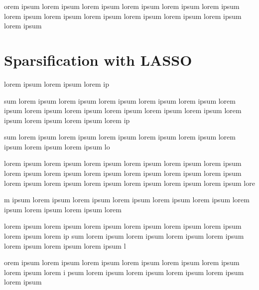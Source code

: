 \documentclass{article}
\begin{document}
\begin{multicols}{2}
orem ipsum lorem ipsum lorem ipsum lorem ipsum lorem ipsum lorem ipsum lorem ipsum lorem ipsum lorem ipsum lorem ipsum lorem ipsum lorem ipsum lorem ipsum





\section{Sparsification with LASSO}

lorem ipsum lorem ipsum lorem ip

sum lorem ipsum lorem ipsum lorem ipsum lorem ipsum lorem ipsum lorem ipsum lorem ipsum lorem ipsum lorem ipsum lorem ipsum lorem ipsum lorem ipsum lorem ipsum lorem ipsum lorem ip

sum lorem ipsum lorem ipsum lorem ipsum lorem ipsum lorem ipsum lorem ipsum lorem ipsum lorem ipsum lo

lorem ipsum lorem ipsum lorem ipsum lorem ipsum lorem ipsum lorem ipsum lorem ipsum lorem ipsum lorem ipsum lorem ipsum lorem ipsum lorem ipsum lorem ipsum lorem ipsum lorem ipsum lorem ipsum lorem ipsum lorem ipsum lore

m ipsum lorem ipsum lorem ipsum lorem ipsum lorem ipsum lorem ipsum lorem ipsum lorem ipsum lorem ipsum lorem 


 lorem ipsum lorem ipsum lorem ipsum lorem ipsum lorem ipsum lorem ipsum lorem ipsum lorem ip
 sum lorem ipsum lorem ipsum lorem ipsum lorem ipsum lorem ipsum lorem ipsum lorem ipsum l
 
 orem ipsum lorem ipsum lorem ipsum lorem ipsum lorem ipsum lorem ipsum lorem ipsum lorem i
 psum lorem ipsum lorem ipsum lorem ipsum lorem ipsum lorem ipsum  
\end{multicols}
\end{document}
